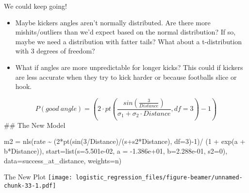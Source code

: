 \documentclass[
  ignorenonframetext,
]{beamer}
\newenvironment{Shaded}{\begin{snugshade}}{\end{snugshade}}
\newcommand{\AttributeTok}[1]{\textcolor[rgb]{0.77,0.63,0.00}{#1}}
\newcommand{\DecValTok}[1]{\textcolor[rgb]{0.00,0.00,0.81}{#1}}
\newcommand{\FloatTok}[1]{\textcolor[rgb]{0.00,0.00,0.81}{#1}}
\newcommand{\FunctionTok}[1]{\textcolor[rgb]{0.00,0.00,0.00}{#1}}
\newcommand{\NormalTok}[1]{#1}
\newcommand{\OtherTok}[1]{\textcolor[rgb]{0.56,0.35,0.01}{#1}}
\newcommand{\SpecialCharTok}[1]{\textcolor[rgb]{0.00,0.00,0.00}{#1}}
\begin{document}
\begin{frame}[fragile]{We could keep going!}
\protect\hypertarget{we-could-keep-going}{}
\begin{itemize}
\item
  Maybe kickers angles aren't normally distributed. Are there more
  mishits/outliers than we'd expect based on the normal distribution? If
  so, maybe we need a distribution with fatter tails? What about a
  t-distribution with 3 degrees of freedom?
\item
  What if angles are more unpredictable for longer kicks? This could if
  kickers are less accurate when they try to kick harder or because
  footballs slice or hook.
\end{itemize}

\[ P(good\ angle) = (2\cdot pt(\frac{sin(\frac{3}{Distance})}{\sigma_1+\sigma_2\cdot Distance}, df=3)-1)\]
\#\# The New Model

\begin{Shaded}
\begin{Highlighting}[]
\NormalTok{m2 }\OtherTok{=} \FunctionTok{nls}\NormalTok{(rate }\SpecialCharTok{\textasciitilde{}}\NormalTok{ (}\DecValTok{2}\SpecialCharTok{*}\FunctionTok{pt}\NormalTok{(}\FunctionTok{sin}\NormalTok{(}\DecValTok{3}\SpecialCharTok{/}\NormalTok{Distance)}\SpecialCharTok{/}\NormalTok{(s}\SpecialCharTok{+}\NormalTok{s2}\SpecialCharTok{*}\NormalTok{Distance), }\AttributeTok{df=}\DecValTok{3}\NormalTok{)}\SpecialCharTok{{-}}\DecValTok{1}\NormalTok{)}\SpecialCharTok{/}
\NormalTok{          (}\DecValTok{1} \SpecialCharTok{+} \FunctionTok{exp}\NormalTok{(a }\SpecialCharTok{+}\NormalTok{ b}\SpecialCharTok{*}\NormalTok{Distance)),}
        \AttributeTok{start=}\FunctionTok{list}\NormalTok{(}\AttributeTok{s=}\FloatTok{5.501e{-}02}\NormalTok{, }
                   \AttributeTok{a =} \SpecialCharTok{{-}}\FloatTok{1.386e+01}\NormalTok{, }
                   \AttributeTok{b=}\FloatTok{2.288e{-}01}\NormalTok{,}
                   \AttributeTok{s2=}\DecValTok{0}\NormalTok{),}
        \AttributeTok{data=}\NormalTok{success\_at\_distance,}
        \AttributeTok{weights=}\NormalTok{n)}
\end{Highlighting}
\end{Shaded}
\end{frame}

\begin{frame}{The New Plot}
\protect\hypertarget{the-new-plot}{}
\texttt{[image: logistic\_regression\_files/figure-beamer/unnamed-chunk-33-1.pdf]}
\end{frame}
\end{document}
